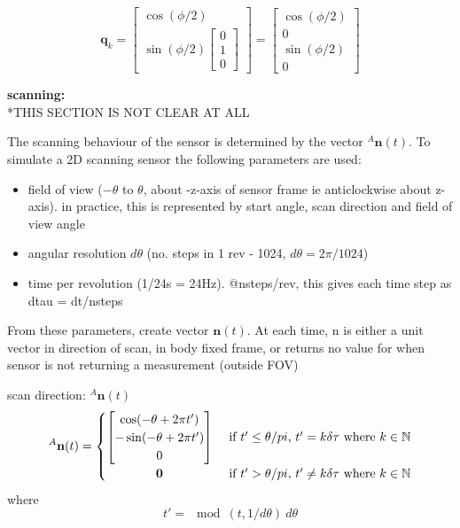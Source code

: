\begin{equation}
	\mathbf{q}_k = \begin{bmatrix}
				 	\cos(\phi/2) \\
				 	\sin(\phi/2){\begin{bmatrix}
								 	0 \\ 1 \\ 0
							   	 \end{bmatrix}}
				 \end{bmatrix}
				 = \begin{bmatrix}
		 		   		\cos(\phi/2) \\ 0 \\ \sin(\phi/2) \\ 0
				   \end{bmatrix}
\end{equation}

\textbf{scanning:}\\
*THIS SECTION IS NOT CLEAR AT ALL

The scanning behaviour of the sensor is determined by the vector ${^{A}\mathbf{n}(t)}$.
To simulate a 2D scanning sensor the following parameters are used:
\begin{itemize}
\item field of view ($-\theta$ to $\theta$, about -z-axis of sensor frame ie anticlockwise about z-axis). in practice, this is represented by start angle, scan direction and field of view angle
\item angular resolution $d\theta$ (no. steps in 1 rev - 1024, $d\theta = 2\pi/1024$)
\item time per revolution (1/24s = 24Hz). @nsteps/rev, this gives each time step as dtau = dt/nsteps
\end{itemize}
From these parameters, create vector $\mathbf{n}(t)$. At each time, n is either a unit vector in direction of scan, in body fixed frame, or returns no value for when sensor is not returning a measurement (outside FOV)

scan direction: $^{A}\mathbf{n}(t)$
\begin{equation}
^{A}\mathbf{n}(t) =
	\begin{cases} 
	      \hfill \begin{bmatrix}
	      		\cos(-\theta + 2\pi t') \\
	      		-\sin(-\theta + 2\pi t') \\
	      		0
	      	\end{bmatrix}    \hfill & \text{ if $t' \leq \theta/pi$, $t' = k\delta\tau$ where $k \in \mathbb{N}$} \\
	      \hfill \mathbf{0} \hfill & \text{ if $t' > \theta/pi$, $t' \neq k\delta\tau$ where $k \in \mathbb{N}$} \\
	\end{cases} 
\end{equation}
where
\begin{equation}
t' = \mod(t,1/d\theta)\:d\theta
\end{equation}

